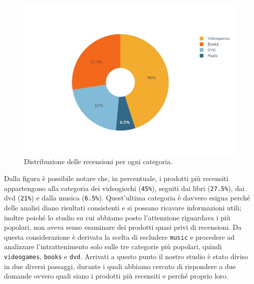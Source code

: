 		\begin{figure} [h]
			\includegraphics[width=\textwidth]{Figure/pie_category}	
			\caption{Distribuzione delle recensioni per ogni categoria.}
			\label{fig:pie_category}
		\end{figure}
		
		Dalla figura è possibile notare che, in percentuale, i prodotti più recensiti appartengono alla categoria dei videogiochi (\verb|45%|), seguiti dai libri (\verb|27.5%|), dai dvd (\verb|21%|) e dalla musica (\verb|6.5%|). Quest'ultima categoria è davvero esigua perché delle analisi diano risultati consistenti e si possano ricavare informazioni utili; inoltre poiché lo studio su cui abbiamo posto l'attenzione riguardava i più popolari, non aveva senso esaminare dei prodotti quasi privi di recensioni. Da questa considerazione è derivata la scelta di escludere \verb|music| e procedere ad analizzare l'intrattenimento solo sulle tre categorie più popolari, quindi \verb|videogames|, \verb|books| e \verb|dvd|. Arrivati a questo punto il nostro studio è stato diviso in due diversi passaggi, durante i quali abbiamo cercato di rispondere a due domande ovvero quali siano i prodotti più recensiti e perché proprio loro. 
			
